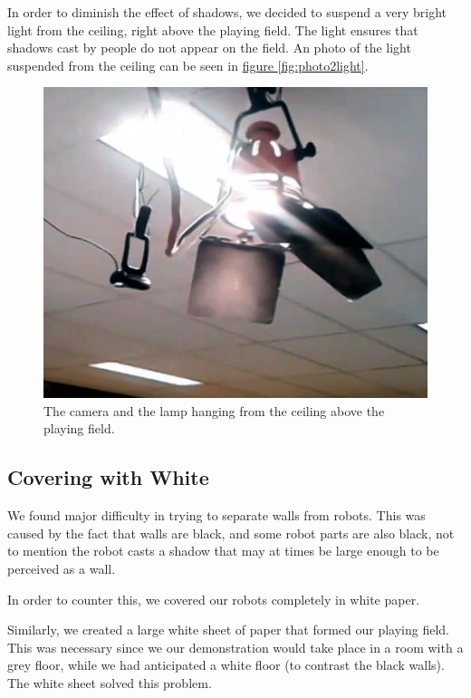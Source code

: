 \documentclass[10pt, abstracton, twocolumn]{scrartcl}
\newcommand{\fref}[1]{\hyperref[#1]{figure \vref{#1}}}
\begin{document}
In order to diminish the effect of shadows, we decided to suspend a very bright light from the ceiling, right above the playing field. The light ensures that shadows cast by people do not appear on the field. An photo of the light suspended from the ceiling can be seen in \fref{fig:photo2light}.

\begin{figure}
	\centering
	\includegraphics[width=\columnwidth]{pictures/photo2light.png}
	\caption{\small The camera and the lamp hanging from the ceiling above the playing field.}
	\label{fig:photo2light}
\end{figure}

\subsection{Covering with White}
We found major difficulty in trying to separate walls from robots. This was caused by the fact that walls are black, and some robot parts are also black, not to mention the robot casts a shadow that may at times be large enough to be perceived as a wall.

In order to counter this, we covered our robots completely in white paper.

Similarly, we created a large white sheet of paper that formed our playing field. This was necessary since we our demonstration would take place in a room with a grey floor, while we had anticipated a white floor (to contrast the black walls). The white sheet solved this problem.
\end{document}
